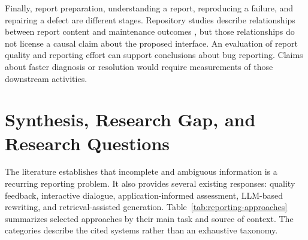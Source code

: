 Finally, report preparation, understanding a report, reproducing a failure, and repairing a defect are different stages. Repository studies describe relationships between report content and maintenance outcomes \cite{soltani2020,joorabchi2014}, but those relationships do not license a causal claim about the proposed interface. An evaluation of report quality and reporting effort can support conclusions about bug reporting. Claims about faster diagnosis or resolution would require measurements of those downstream activities.

\section{Synthesis, Research Gap, and Research Questions}

The literature establishes that incomplete and ambiguous information is a recurring reporting problem. It also provides several existing responses: quality feedback, interactive dialogue, application-informed assessment, LLM-based rewriting, and retrieval-assisted generation. Table~\ref{tab:reporting-approaches} summarizes selected approaches by their main task and source of context. The categories describe the cited systems rather than an exhaustive taxonomy.

